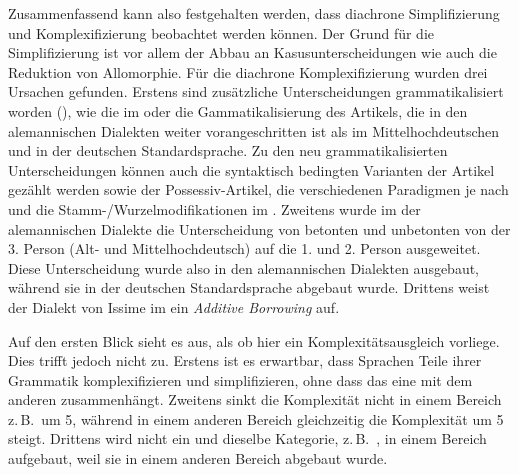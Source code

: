 Zusammenfassend kann also festgehalten werden, dass diachrone Simplifizierung und Komplexifizierung beobachtet werden können. Der Grund für die Simplifizierung ist vor allem der Abbau an Kasusunterscheidungen wie auch die Reduktion von Allomorphie. Für die diachrone Komplexifizierung wurden drei Ursachen gefunden. Erstens sind zusätzliche Unterscheidungen grammatikalisiert worden (), wie die  im  oder die Gammatikalisierung des Artikels, die in den alemannischen Dialekten weiter vorangeschritten ist als im Mittelhochdeutschen und in der deutschen Standardsprache. Zu den neu grammatikalisierten Unterscheidungen können auch die syntaktisch bedingten Varianten der Artikel gezählt werden sowie der Possessiv-Artikel, die verschiedenen Paradigmen je nach  und die Stamm-/Wur\-zel\-mo\-di\-fi\-ka\-tio\-nen im . Zweitens wurde im  der alemannischen Dialekte die Unterscheidung von betonten und unbetonten  von der 3. Person (Alt- und Mittelhochdeutsch) auf die 1. und 2. Person ausgeweitet. Diese Unterscheidung wurde also in den alemannischen Dialekten ausgebaut, während sie in der deutschen Standardsprache abgebaut wurde. Drittens weist der Dialekt von Issime im  ein \textit{Additive Borrowing} auf.

Auf den ersten Blick sieht es aus, als ob hier ein Komplexitätsausgleich vorliege. Dies trifft jedoch nicht zu. Erstens ist es erwartbar, dass Sprachen Teile ihrer Grammatik komplexifizieren und simplifizieren, ohne dass das eine mit dem anderen zusammenhängt. Zweitens sinkt die Komplexität nicht in einem Bereich z.\,B.\ um 5, während in einem anderen Bereich gleichzeitig die Komplexität um 5 steigt. Drittens wird nicht ein und dieselbe Kategorie, z.\,B.\ , in einem Bereich aufgebaut, weil sie in einem anderen Bereich abgebaut wurde. \\


